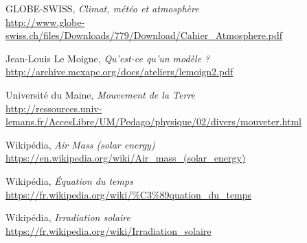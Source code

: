 \documentclass[12pt]{article}
\begin{document}
\begin{thebibliography}{99}
	GLOBE-SWISS,
	\emph{Climat, météo et atmosphère}\\
	\url{http://www.globe-swiss.ch/files/Downloads/779/Download/Cahier_Atmosphere.pdf}

	Jean-Louis Le Moigne,
	\emph{Qu'est-ce qu'un modèle ?}\\
	\url{http://archive.mcxapc.org/docs/ateliers/lemoign2.pdf}

	Université du Maine,
	\emph{Mouvement de la Terre}\\
	\url{http://ressources.univ-lemans.fr/AccesLibre/UM/Pedago/physique/02/divers/mouveter.html}

	Wikipédia,
	\emph{Air Mass (solar energy)}\\
	\url{https://en.wikipedia.org/wiki/Air_mass_(solar_energy)}

	Wikipédia,
	\emph{Équation du temps}\\
	\url{https://fr.wikipedia.org/wiki/%C3%89quation_du_temps}
	
	Wikipédia,
	\emph{Irradiation solaire}\\
	\url{https://fr.wikipedia.org/wiki/Irradiation_solaire}

\end{thebibliography}
\end{document}
